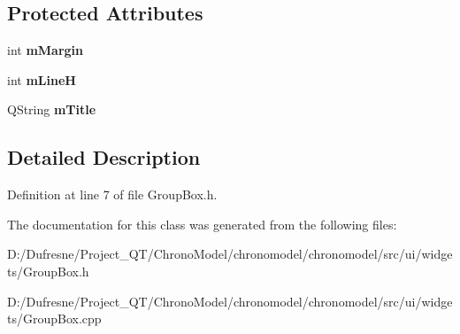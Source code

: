 \subsection*{Protected Attributes}
\begin{DoxyCompactItemize}
\item 
\hypertarget{class_group_box_a52788cae591d430707b9e61ce97ba744}{int {\bfseries m\-Margin}}\label{class_group_box_a52788cae591d430707b9e61ce97ba744}

\item 
\hypertarget{class_group_box_aecd6cbc2a554fd6e68910d981457c903}{int {\bfseries m\-Line\-H}}\label{class_group_box_aecd6cbc2a554fd6e68910d981457c903}

\item 
\hypertarget{class_group_box_a49426e67efe5e35c71d7c9c82feb47b2}{Q\-String {\bfseries m\-Title}}\label{class_group_box_a49426e67efe5e35c71d7c9c82feb47b2}

\end{DoxyCompactItemize}


\subsection{Detailed Description}


Definition at line 7 of file Group\-Box.\-h.



The documentation for this class was generated from the following files\-:\begin{DoxyCompactItemize}
\item 
D\-:/\-Dufresne/\-Project\-\_\-\-Q\-T/\-Chrono\-Model/chronomodel/chronomodel/src/ui/widgets/Group\-Box.\-h\item 
D\-:/\-Dufresne/\-Project\-\_\-\-Q\-T/\-Chrono\-Model/chronomodel/chronomodel/src/ui/widgets/Group\-Box.\-cpp\end{DoxyCompactItemize}
